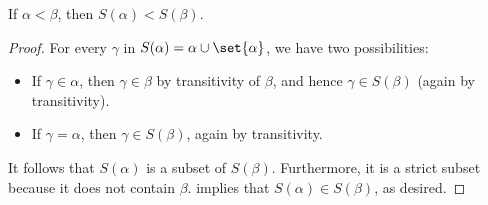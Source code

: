\begin{lemma}\label{thm:ordinal_successor_strictly_monotone_on_ordinals}
  If \( \alpha < \beta \), then \( S(\alpha) < S(\beta) \).
\end{lemma}
\begin{proof}
  For every \( \gamma \) in \( S(\alpha) = \alpha \cup \set{ \alpha } \), we have two possibilities:
  \begin{itemize}
    \item If \( \gamma \in \alpha \), then \( \gamma \in \beta \) by transitivity of \( \beta \), and hence \( \gamma \in S(\beta) \) (again by transitivity).

    \item If \( \gamma = \alpha \), then \( \gamma \in S(\beta) \), again by transitivity.
  \end{itemize}

  It follows that \( S(\alpha) \) is a subset of \( S(\beta) \). Furthermore, it is a strict subset because it does not contain \( \beta \).  implies that \( S(\alpha) \in S(\beta) \), as desired.
\end{proof}

